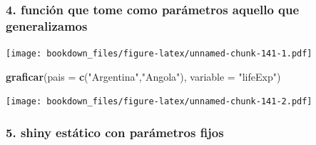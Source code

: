 \documentclass[]{book}
\newenvironment{Shaded}{\begin{snugshade}}{\end{snugshade}}
\newcommand{\CommentTok}[1]{\textcolor[rgb]{0.56,0.35,0.01}{\textit{#1}}}
\newcommand{\ControlFlowTok}[1]{\textcolor[rgb]{0.13,0.29,0.53}{\textbf{#1}}}
\newcommand{\DataTypeTok}[1]{\textcolor[rgb]{0.13,0.29,0.53}{#1}}
\newcommand{\KeywordTok}[1]{\textcolor[rgb]{0.13,0.29,0.53}{\textbf{#1}}}
\newcommand{\NormalTok}[1]{#1}
\newcommand{\OperatorTok}[1]{\textcolor[rgb]{0.81,0.36,0.00}{\textbf{#1}}}
\newcommand{\StringTok}[1]{\textcolor[rgb]{0.31,0.60,0.02}{#1}}
\begin{document}
\hypertarget{funcion-que-tome-como-parametros-aquello-que-generalizamos}{%
\subsubsection{4. función que tome como parámetros aquello que generalizamos}\label{funcion-que-tome-como-parametros-aquello-que-generalizamos}}

\begin{Shaded}
\end{Shaded}

\texttt{[image: bookdown\_files/figure-latex/unnamed-chunk-141-1.pdf]}

\begin{Shaded}
\begin{Highlighting}[]
\KeywordTok{graficar}\NormalTok{(}\DataTypeTok{pais =} \KeywordTok{c}\NormalTok{(}\StringTok{"Argentina"}\NormalTok{,}\StringTok{"Angola"}\NormalTok{), }\DataTypeTok{variable =} \StringTok{"lifeExp"}\NormalTok{)}
\end{Highlighting}
\end{Shaded}

\texttt{[image: bookdown\_files/figure-latex/unnamed-chunk-141-2.pdf]}

\hypertarget{shiny-estatico-con-parametros-fijos}{%
\subsubsection{5. shiny estático con parámetros fijos}\label{shiny-estatico-con-parametros-fijos}}
\end{document}
